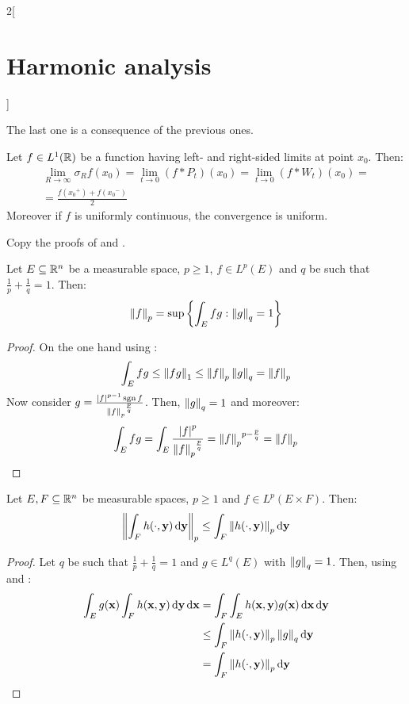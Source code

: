 \documentclass[../../../main_math.tex]{subfiles}
\begin{document}
\begin{multicols}{2}[\section{Harmonic analysis}]
\begin{sproof}
    The last one is a consequence of the previous ones.
  \end{sproof}
  \begin{theorem}
    Let $f\in L^1(\mathbb{R})$ be a function having left- and right-sided limits at point $x_0$. Then:
    \begin{multline*}
      \lim_{R\to\infty}\sigma_Rf(x_0)=\lim_{t\to 0}(f*P_t)(x_0)=\lim_{t\to 0}(f*W_t)(x_0)=\\=\frac{f({x_0}^+)+f({x_0}^-)}{2}
    \end{multline*}
    Moreover if $f$ is uniformly continuous, the convergence is uniform.
  \end{theorem}
  \begin{sproof}
    Copy the proofs of  and .
  \end{sproof}
  \begin{lemma}\label{HA:normLpEquiv}
    Let $E\subseteq\mathbb{R}^n$ be a measurable space, $p\geq 1$, $f\in L^p(E)$ and $q$ be such that $\frac{1}{p}+\frac{1}{q}=1$. Then:
    $$\left\|f\right\|_p=\sup\left\{\int_Efg:\left\|g\right\|_q=1\right\}$$
  \end{lemma}
  \begin{proof}
    On the one hand using : $$\int_Efg\leq\left\|fg\right\|_1\leq\left\|f\right\|_p\left\|g\right\|_q=\left\|f\right\|_p$$
    Now consider $g=\frac{\abs{f}^{p-1}\operatorname{sgn} f}{{\left\|f\right\|_p}^{\frac{p}{q}}}$. Then, $\left\|g\right\|_q=1$ and moreover: $$\int_Efg=\int_E\frac{\abs{f}^p}{{\left\|f\right\|_p}^{\frac{p}{q}}}={\left\|f\right\|_p}^{p-\frac{p}{q}}=\left\|f\right\|_p$$
  \end{proof}
  \begin{lemma}\label{HA:minkowski}
    Let $E,F\subseteq\mathbb{R}^n$ be measurable spaces, $p\geq 1$ and $f\in L^p(E\times F)$. Then:
    $$\left\|\int_F h(\cdot,\boldsymbol{\mathrm{y}})\dd{\boldsymbol{\mathrm{y}}}\right\|_p\leq\int_F\left\|h(\cdot,\boldsymbol{\mathrm{y}})\right\|_p\dd{\boldsymbol{\mathrm{y}}}$$
  \end{lemma}
  \begin{proof}
    Let $q$ be such that $\frac{1}{p}+\frac{1}{q}=1$ and $g\in L^q(E)$ with $\left\|g\right\|_q=1$. Then, using  and :
    \begin{align*}
      \int_Eg(\vf{x})\int_F h(\vf{x},\vf{y})\dd{\vf{y}}\dd{\vf{x}} & =\int_F\int_E h(\vf{x},\vf{y})g(\vf{x})\dd{\vf{x}}\dd{\vf{y}} \\
                                                                   & \leq \int_F\norm{h(\cdot,\vf{y})}_p\norm{g}_q\dd{\vf{y}}      \\
                                                                   & =\int_F\norm{h(\cdot,\vf{y})}_p\dd{\vf{y}}

\end{align*}
\end{proof}
\end{multicols}
\end{document}
